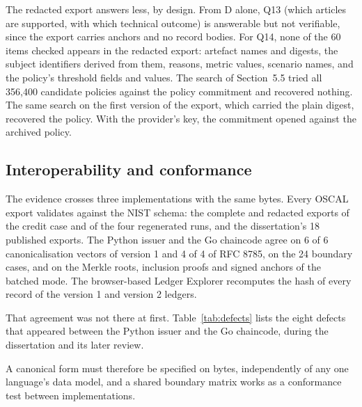 The redacted export answers less, by design. From D alone, Q13 (which articles are supported, with which technical outcome) is answerable but not verifiable, since the export carries anchors and no record bodies. For Q14, none of the 60 items checked appears in the redacted export: artefact names and digests, the subject identifiers derived from them, reasons, metric values, scenario names, and the policy's threshold fields and values. The search of Section~5.5 tried all 356,400 candidate policies against the policy commitment and recovered nothing. The same search on the first version of the export, which carried the plain digest, recovered the policy. With the provider's key, the commitment opened against the archived policy.

\subsection{Interoperability and conformance}
\label{sec:eval-interop}

The evidence crosses three implementations with the same bytes. Every OSCAL export validates against the NIST schema: the complete and redacted exports of the credit case and of the four regenerated runs, and the dissertation's 18 published exports. The Python issuer and the Go chaincode agree on 6 of 6 canonicalisation vectors of version 1 and 4 of 4 of RFC 8785, on the 24 boundary cases, and on the Merkle roots, inclusion proofs and signed anchors of the batched mode. The browser-based Ledger Explorer recomputes the hash of every record of the version 1 and version 2 ledgers.

That agreement was not there at first. Table~\ref{tab:defects} lists the eight defects that appeared between the Python issuer and the Go chaincode, during the dissertation and its later review.



A canonical form must therefore be specified on bytes, independently of any one language's data model, and a shared boundary matrix works as a conformance test between implementations.
